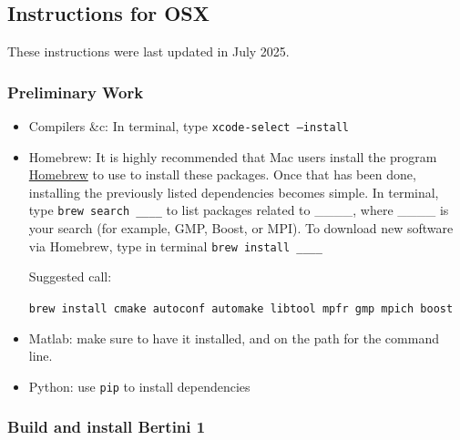 
\subsection{Instructions for OSX}

These instructions were last updated in July 2025.


\subsubsection{Preliminary Work}
\begin{itemize}
  \item Compilers \&c: In terminal, type {\tt xcode-select --install}
   
  \item Homebrew: It is highly recommended that Mac users install the program \href{http://brew.sh}{Homebrew} to use to install these packages. Once that has been done, installing the previously listed dependencies becomes simple. In terminal,  type \texttt{brew search \_\_\_\_} to list packages related to \_\_\_\_, where \_\_\_\_ is your search (for example, GMP, Boost, or MPI). To download new software via Homebrew, type in terminal \texttt{brew install \_\_\_\_} 

  Suggested call:

  \texttt{brew install cmake autoconf automake libtool mpfr gmp mpich boost}
   \item Matlab: make sure to have it installed, and on the path for the command line.
   \item Python: use {\tt pip} to install dependencies
\end{itemize}


\subsubsection{Build and install Bertini 1}

